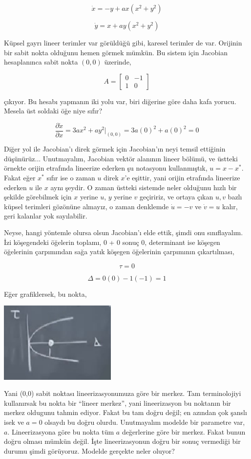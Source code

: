 \documentclass[12pt,fleqn]{article}\usepackage{../../common}
\begin{document}
$$ \dot{x} = -y + ax(x^2 + y^2) $$

$$ \dot{y} = x + ay (x^2 + y^2) $$

Küpsel gayrı lineer terimler var görüldüğü gibi, karesel terimler de
var. Orijinin bir sabit nokta olduğunu hemen görmek mümkün. Bu sistem için
Jacobian hesaplanınca sabit nokta $(0,0)$ üzerinde,

$$ A = \left[\begin{array}{rrr}
0  & -1 \\ 1 & 0
\end{array}\right] $$

çıkıyor. Bu hesabı yapmanın iki yolu var, biri diğerine göre daha kafa
yorucu. Mesela üst soldaki öğe niye sıfır?

$$ \frac{\partial \dot{x}}{\partial x} =
3ax^2 + ay^2 \bigg|_{(0,0)} = 3a(0)^2 + a(0)^2 = 0
$$

Diğer yol ile Jacobian'ı direk görmek için Jacobian'ın neyi temsil ettiğinin
düşünürüz... Unutmayalım, Jacobian vektör alanının lineer bölümü, ve üstteki
örnekte orijin etrafında lineerize ederken şu notasyonu kullanmıştık, $u = x -
x^\ast$. Fakat eğer $x^\ast$ sıfır ise o zaman $u$ direk $x$'e eşittir, yani orijin
etrafında lineerize ederken $u$ ile $x$ aynı şeydir. O zaman üstteki sistemde
neler olduğunu hızlı bir şekilde görebilmek için $x$ yerine $u$, $y$ yerine $v$
geçiririz, ve ortaya çıkan $u,v$ bazlı küpsel terimleri gözönüne almayız, o
zaman denklemde $\dot{u} = -v$ ve $\dot{v} = u$ kalır, geri kalanlar yok
sayılabilir.

Neyse, hangi yöntemle olursa olsun Jacobian'ı elde ettik, şimdi onu
sınıflayalım. İzi köşegendeki öğelerin toplamı, 0 + 0 sonuç 0, determinant ise
köşegen öğelerinin çarpımından sağa yatık köşegen öğelerinin çarpımının
çıkartılması,

$$ \tau = 0 $$

$$ \Delta = 0(0) - 1(-1) = 1 $$

Eğer grafiklersek, bu nokta,

\includegraphics[height=4cm]{06_02.png}

Yani (0,0) sabit noktası lineerizasyonumuza göre bir merkez. Tam terminolojiyi
kullanırsak bu nokta bir ``lineer merkez'', yani lineerizasyon bu noktanın bir
merkez oldugunu tahmin ediyor. Fakat bu tam doğru değil; en azından çok şanslı
isek ve $a=0$ olsaydı bu doğru olurdu. Unutmayalım modelde bir parametre var,
$a$. Lineerizasyona göre bu nokta tüm $a$ değerlerine göre bir merkez. Fakat
bunun doğru olması mümkün değil. İşte lineerizasyonun doğru bir sonuç vermediği
bir durumu şimdi görüyoruz. Modelde gerçekte neler oluyor?
\end{document}
